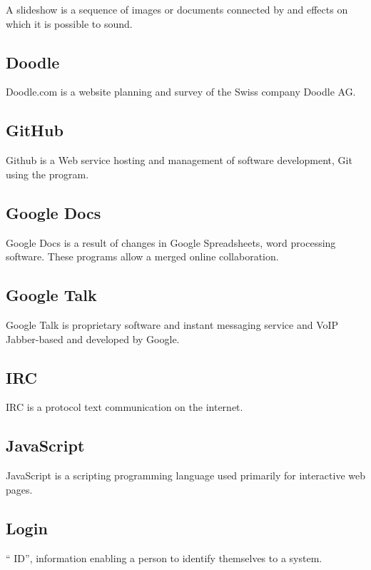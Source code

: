 \documentclass{life-fr}
\begin{document}
A slideshow is a sequence of images or documents connected by and effects on which it is possible to sound.

\subsection {Doodle}

Doodle.com is a website planning and survey of the Swiss company Doodle AG.

\subsection {GitHub}

Github is a Web service hosting and management of software development, Git using the program. 

\subsection {Google Docs}

Google Docs is a result of changes in Google Spreadsheets, word processing software. These programs allow a merged online collaboration.

\subsection {Google Talk}

Google Talk is proprietary software and instant messaging service and VoIP Jabber-based and developed by Google.

\subsection {IRC}

IRC is a protocol text communication on the internet.

\subsection {JavaScript}

JavaScript is a scripting programming language used primarily for interactive web pages.

\subsection {Login}

`` ID'', information enabling a person to identify themselves to a system.
\end{document}
